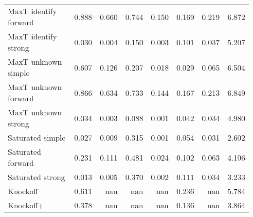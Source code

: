 \begin{tabular}{lrrrrrrr}
MaxT identify forward &                0.888 &                       0.660 &                                           0.744 &                      0.150 &                       0.169 &                                          0.219 &                   6.872 \\
MaxT identify strong  &                0.030 &                       0.004 &                                           0.150 &                      0.003 &                       0.101 &                                          0.037 &                   5.207 \\
MaxT unknown simple   &                0.607 &                       0.126 &                                           0.207 &                      0.018 &                       0.029 &                                          0.065 &                   6.504 \\
MaxT unknown forward  &                0.866 &                       0.634 &                                           0.733 &                      0.144 &                       0.167 &                                          0.213 &                   6.849 \\
MaxT unknown strong   &                0.034 &                       0.003 &                                           0.088 &                      0.001 &                       0.042 &                                          0.034 &                   4.980 \\
Saturated simple      &                0.027 &                       0.009 &                                           0.315 &                      0.001 &                       0.054 &                                          0.031 &                   2.602 \\
Saturated forward     &                0.231 &                       0.111 &                                           0.481 &                      0.024 &                       0.102 &                                          0.063 &                   4.106 \\
Saturated strong      &                0.013 &                       0.005 &                                           0.370 &                      0.002 &                       0.111 &                                          0.034 &                   3.233 \\
Knockoff              &                0.611 &                         nan &                                             nan &                        nan &                       0.236 &                                            nan &                   5.784 \\
Knockoff+             &                0.378 &                         nan &                                             nan &                        nan &                       0.136 &                                            nan &                   3.864 \\
\bottomrule
\end{tabular}
